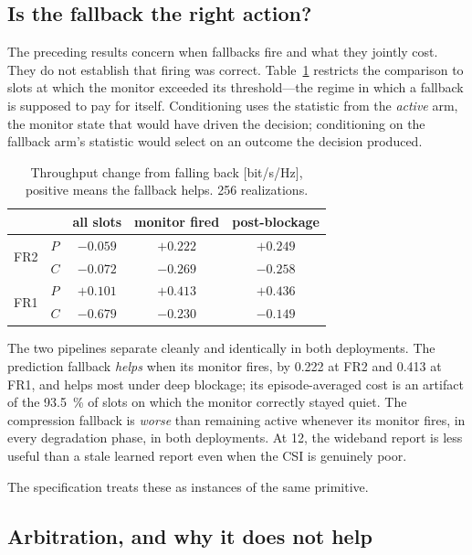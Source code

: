 \subsection{Is the fallback the right action?}
\label{sec:conditional}

The preceding results concern when fallbacks fire and what they jointly
cost. They do not establish that firing was correct. Table~\ref{tab:conditional}
restricts the comparison to slots at which the monitor exceeded its
threshold---the regime in which a fallback is supposed to pay for itself.
Conditioning uses the statistic from the \emph{active} arm, the monitor
state that would have driven the decision; conditioning on the fallback
arm's statistic would select on an outcome the decision produced.

\begin{table}[t]
\caption{Throughput change from falling back [bit/s/Hz], positive means the
fallback helps. 256 realizations.}
\label{tab:conditional}
\centering
\begin{tabular}{llccc}
\toprule
 & & all slots & monitor fired & post-blockage \\
\midrule
\multirow{2}{*}{FR2}
 & $P$ & $-0.059$ & $+0.222$ & $+0.249$ \\
 & $C$ & $-0.072$ & $-0.269$ & $-0.258$ \\
\midrule
\multirow{2}{*}{FR1}
 & $P$ & $+0.101$ & $+0.413$ & $+0.436$ \\
 & $C$ & $-0.679$ & $-0.230$ & $-0.149$ \\
\bottomrule
\end{tabular}
\end{table}

The two pipelines separate cleanly and identically in both deployments. The
prediction fallback \emph{helps} when its monitor fires, by
\SI{0.222}{} at FR2 and \SI{0.413}{} at FR1, and helps most under deep
blockage; its episode-averaged cost is an artifact of the
\SI{93.5}{\percent} of slots on which the monitor correctly stayed quiet.
The compression fallback is \emph{worse} than remaining active whenever its
monitor fires, in every degradation phase, in both deployments. At
\SI{12}{\bit}, the wideband report is less useful than a stale learned
report even when the CSI is genuinely poor.

The specification treats these as instances of the same primitive.

\subsection{Arbitration, and why it does not help}
\label{sec:arbiter}

